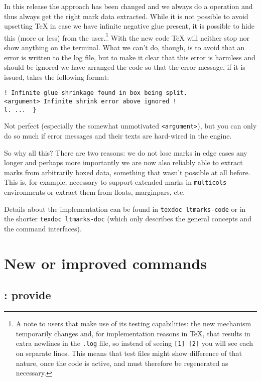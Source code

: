 \documentclass{ltnews}
\providecommand\env[1]{\texttt{#1}}
\providecommand\env[1]{\texttt{#1}}
\begin{document}
In this release the approach has been changed and we always do a
 operation and thus always get the right mark data
extracted. While it is not possible to avoid upsetting \TeX{} in case
we have infinite negative glue present, it is possible to hide this
(more or less) from the user.\footnote{A note to  users
that make use of its testing capabilities: the new mechanism
temporarily changes  and, for implementation
reasons in \TeX{}, that results in extra newlines in the \texttt{.log}
file, so instead of seeing \texttt{[1] [2]} you will see each on
separate lines. This means that test files might show difference of
that nature, once the code is active, and must therefore be
regenerated as necessary.}  With the new code \TeX{} will neither stop
nor show anything on the terminal. What we can't do, though, is to
avoid that an error is written to the log file, but to make it clear
that this error is harmless and should be ignored we have arranged the
code so that the error message, if it is issued, takes the following
format:
\begin{verbatim}
! Infinite glue shrinkage found in box being split.
<argument> Infinite shrink error above ignored ! 
l. ...  }
\end{verbatim}
Not perfect (especially the somewhat unmotivated \texttt{<argument>}),
but you can only do so much if error messages and their texts are
hard-wired in the engine.

So why all this? There are two reasons: we do not lose marks in edge
cases any longer and perhaps more importantly we are now also reliably
able to extract marks from arbitrarily boxed data, something that
wasn't possible at all before. This is, for example, necessary to
support extended marks in \env{multicols} environments or extract them
from floats, marginpars, etc.

Details about the implementation can be found in \texttt{texdoc
  ltmarks-code} or in the shorter \texttt{texdoc ltmarks-doc} (which
only describes the general concepts and  the command interfaces).

\section{New or improved commands}

\subsection{: provide }
\end{document}
